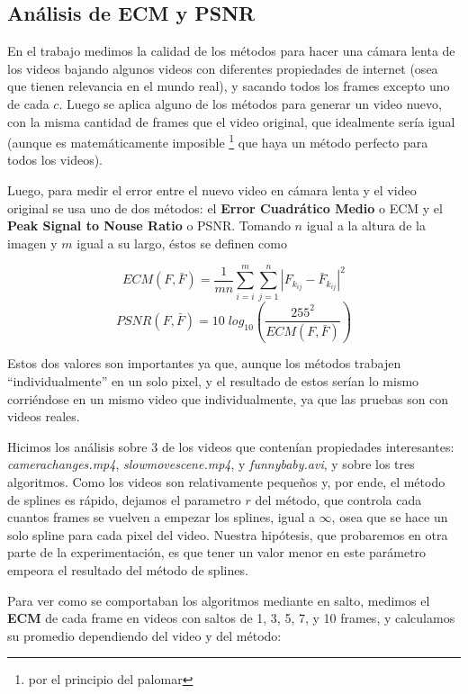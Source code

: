 \subsection {An\'alisis de ECM y PSNR}

En el trabajo medimos la calidad de los m\'etodos para hacer una c\'amara lenta
de los videos bajando algunos videos con diferentes propiedades de internet
(osea que tienen relevancia en el mundo real), y sacando todos los frames
excepto uno de cada $c$. Luego se aplica alguno de los m\'etodos para generar un
video nuevo, con la misma cantidad de frames que el video original, que
idealmente ser\'ia igual (aunque es matem\'aticamente imposible \footnote{por el
principio del palomar} que haya un m\'etodo perfecto para todos los videos).

Luego, para medir el error entre el nuevo video en c\'amara lenta y el video
original se usa uno de dos m\'etodos: el \textbf{Error Cuadr\'atico Medio} o ECM
y el \textbf{Peak Signal to Nouse Ratio} o PSNR. Tomando $n$ igual a la altura 
de la imagen y $m$ igual a su largo, \'estos se definen como

\[
ECM(F, \bar{F}) = \frac{1}{m n} \sum^m_{i = i} \sum^n_{j = 1} \left| F_{k_{i j}} - \bar{F}_{k_{i j}} \right|^2
\]
\[
PSNR(F, \bar{F}) = 10 \; log_{10} \left( \frac{255^2}{ECM(F, \bar{F})} \right)
\]

Estos dos valores son importantes ya que, aunque los m\'etodos trabajen
``individualmente'' en un solo pixel, y el resultado de estos ser\'ian lo mismo
corri\'endose en un mismo video que individualmente, ya que las pruebas son con videos
reales.

Hicimos los an\'alisis sobre 3 de los videos que conten\'ian propiedades
interesantes: \textit{camerachanges.mp4}, \textit{slowmovescene.mp4}, y
\textit{funnybaby.avi}, y sobre los tres algoritmos. Como los videos son
relativamente peque\~nos y, por ende, el m\'etodo de splines es r\'apido,
dejamos el parametro $r$ del m\'etodo, que controla cada cuantos frames se
vuelven a empezar los splines, igual a $\infty$, osea que se hace un solo spline
para cada pixel del video. Nuestra hip\'otesis, que probaremos en otra parte de
la experimentaci\'on, es que tener un valor menor en este par\'ametro empeora el
resultado del m\'etodo de splines.

Para ver como se comportaban los algoritmos mediante en salto, medimos el
\textbf{ECM} de cada frame en videos con saltos de 1, 3, 5, 7, y 10 frames, y
calculamos su promedio dependiendo del video y del m\'etodo:

